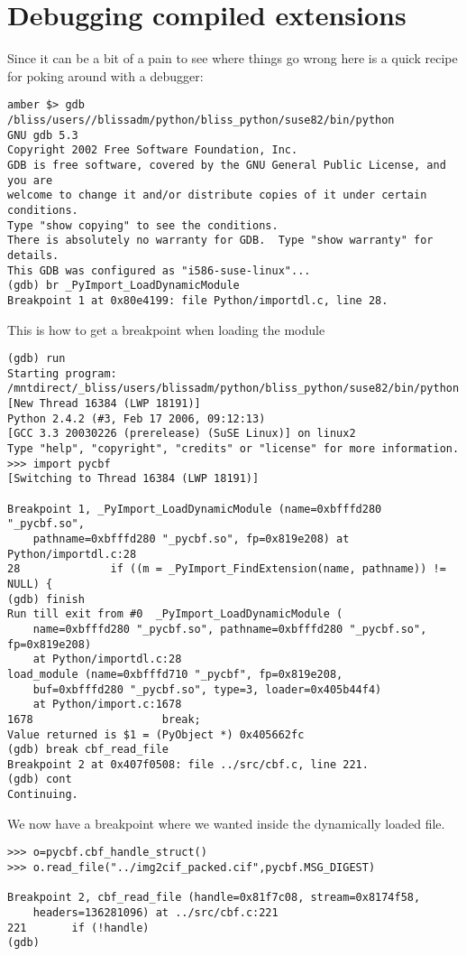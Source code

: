 \documentclass[10pt,a4paper,twoside,notitlepage]{article}
\begin{document}
\section{Debugging compiled extensions}

Since it can be a bit of a pain to see where things go wrong here is a
quick recipe for poking around with a debugger:

\begin{verbatim}
amber $> gdb /bliss/users//blissadm/python/bliss_python/suse82/bin/python
GNU gdb 5.3
Copyright 2002 Free Software Foundation, Inc.
GDB is free software, covered by the GNU General Public License, and you are
welcome to change it and/or distribute copies of it under certain conditions.
Type "show copying" to see the conditions.
There is absolutely no warranty for GDB.  Type "show warranty" for details.
This GDB was configured as "i586-suse-linux"...
(gdb) br _PyImport_LoadDynamicModule
Breakpoint 1 at 0x80e4199: file Python/importdl.c, line 28.
\end{verbatim}

This is how to get a breakpoint when loading the module
\begin{verbatim}
(gdb) run
Starting program: /mntdirect/_bliss/users/blissadm/python/bliss_python/suse82/bin/python
[New Thread 16384 (LWP 18191)]
Python 2.4.2 (#3, Feb 17 2006, 09:12:13)
[GCC 3.3 20030226 (prerelease) (SuSE Linux)] on linux2
Type "help", "copyright", "credits" or "license" for more information.
>>> import pycbf
[Switching to Thread 16384 (LWP 18191)]

Breakpoint 1, _PyImport_LoadDynamicModule (name=0xbfffd280 "_pycbf.so",
    pathname=0xbfffd280 "_pycbf.so", fp=0x819e208) at Python/importdl.c:28
28              if ((m = _PyImport_FindExtension(name, pathname)) != NULL) {
(gdb) finish
Run till exit from #0  _PyImport_LoadDynamicModule (
    name=0xbfffd280 "_pycbf.so", pathname=0xbfffd280 "_pycbf.so", fp=0x819e208)
    at Python/importdl.c:28
load_module (name=0xbfffd710 "_pycbf", fp=0x819e208,
    buf=0xbfffd280 "_pycbf.so", type=3, loader=0x405b44f4)
    at Python/import.c:1678
1678                    break;
Value returned is $1 = (PyObject *) 0x405662fc
(gdb) break cbf_read_file
Breakpoint 2 at 0x407f0508: file ../src/cbf.c, line 221.
(gdb) cont
Continuing.
\end{verbatim}

We now have a breakpoint where we wanted inside the dynamically loaded file. 
\begin{verbatim}
>>> o=pycbf.cbf_handle_struct()
>>> o.read_file("../img2cif_packed.cif",pycbf.MSG_DIGEST)

Breakpoint 2, cbf_read_file (handle=0x81f7c08, stream=0x8174f58,
    headers=136281096) at ../src/cbf.c:221
221       if (!handle)
(gdb)
\end{verbatim}
\end{document}
